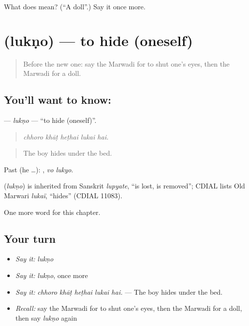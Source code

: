 \begin{tcolorbox}[breakable,colback=teal!4,colframe=teal!35!black,title={Before you move on}]
What does  mean? (\textquotedblleft{}A doll\textquotedblright{}.) Say it once more.
\end{tcolorbox}
\section[\texorpdfstring{\mw{लुकणो} (lukṇo)}{लुकणो (lukṇo)}]{ (lukṇo) — to hide (oneself)}

\label{lesson:MW-C278-lukno}



\begin{quote}
Before the new one: say the Marwadi for to shut one's eyes, then the Marwadi for a doll.
\end{quote}

\subsection*{You'll want to know: }
\textbf{} — \emph{lukṇo} — \textquotedblleft{}to hide (oneself)\textquotedblright{}.

\begin{quote}
    
\end{quote}

\begin{quote}
\emph{chhoro khāṭ heṭhai lukai hai.}
\end{quote}

\begin{quote}
The boy hides under the bed.
\end{quote}

Past (he …):  , \emph{vo lukyo}.

\begin{cousinweb}
\textbf{} (\emph{lukṇo}) is inherited from Sanskrit \emph{lupyate}, \textquotedblleft{}is lost, is removed\textquotedblright{}; CDIAL lists Old Marwari \emph{lukaï}, \textquotedblleft{}hides\textquotedblright{} (CDIAL 11083).
\end{cousinweb}

\begin{grammarlens}[title={What you've built}]
One more word for this chapter.
\end{grammarlens}

\subsection*{Your turn}
\begin{itemize}
\raggedright
  \item \emph{Say it:} \emph{lukṇo}
  \item \emph{Say it:} \emph{lukṇo}, once more
  \item \emph{Say it:} \emph{chhoro khāṭ heṭhai lukai hai.} — The boy hides under the bed.
  \item \emph{Recall:} say the Marwadi for to shut one's eyes, then the Marwadi for a doll, then say \emph{lukṇo} again
\end{itemize}

